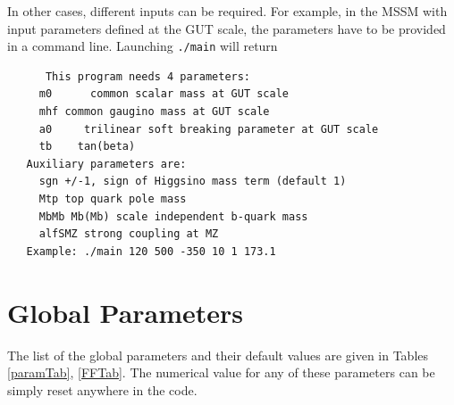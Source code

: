 \documentclass[12pt,a4paper]{article}
\begin{document}
In other cases, different inputs can be required. For example, in the MSSM with input parameters defined at the GUT scale,
the parameters have to be provided in a command line. Launching \verb|./main| will return 
\begin{verbatim}
      This program needs 4 parameters:
     m0      common scalar mass at GUT scale
     mhf common gaugino mass at GUT scale
     a0     trilinear soft breaking parameter at GUT scale
     tb    tan(beta)
   Auxiliary parameters are:
     sgn +/-1, sign of Higgsino mass term (default 1)
     Mtp top quark pole mass
     MbMb Mb(Mb) scale independent b-quark mass
     alfSMZ strong coupling at MZ
   Example: ./main 120 500 -350 10 1 173.1
\end{verbatim}



\section{ Global Parameters}

 The list of the
global parameters  and their default values  are given  in Tables
\ref{paramTab}, \ref{FFTab}. 
The numerical value for any of these parameters can be simply reset anywhere in the code. 
\end{document}
